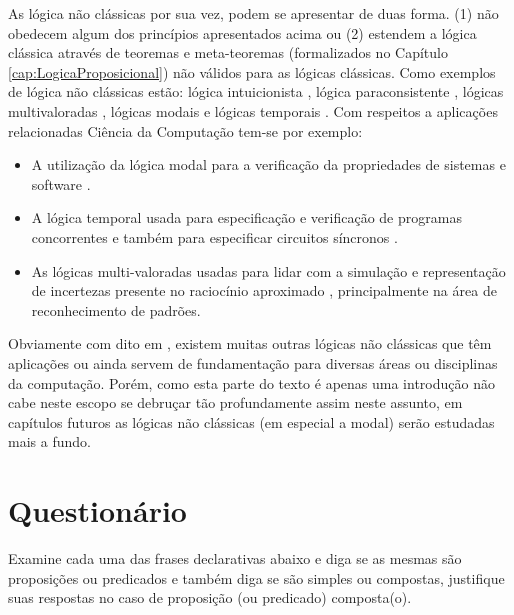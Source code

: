 As lógica não clássicas por sua vez, podem se apresentar de duas forma. (1) não obedecem algum dos princípios apresentados acima ou (2) estendem a lógica clássica através de teoremas e meta-teoremas (formalizados no Capítulo \ref{cap:LogicaProposicional}) não válidos para as lógicas clássicas. Como exemplos de lógica não clássicas estão: lógica intuicionista \cite{lungarzo1972}, lógica paraconsistente \cite{da2008logica}, lógicas multivaloradas \cite{BenjaV1, magnus2020}, lógicas modais \cite{magnus2020} e lógicas temporais \cite{halpern1983, harel1979, manna1979}. Com respeitos a aplicações relacionadas Ciência da Computação tem-se por exemplo:

\begin{itemize}
	\item A utilização da lógica modal para a verificação da propriedades de sistemas e software \cite{harel1979}.
	\item A lógica temporal usada para especificação e verificação de programas
concorrentes \cite{manna1979} e também para especificar circuitos síncronos \cite{halpern1983}.
	\item As lógicas multi-valoradas usadas para lidar com a simulação e representação de
incertezas presente no raciocínio aproximado \cite{BenjaV1}, principalmente na área de reconhecimento de padrões.
\end{itemize}

Obviamente com dito em \cite{BenjaV1}, existem muitas outras lógicas não clássicas que têm aplicações ou ainda servem de fundamentação para diversas áreas ou disciplinas da computação. Porém, como esta parte do texto é apenas uma introdução não cabe neste escopo se debruçar tão profundamente assim neste assunto, em capítulos futuros as lógicas não clássicas (em especial a modal) serão estudadas mais a fundo. 
 
 \section{Questionário}
 
 \begin{exercise}
 	Examine cada uma das frases declarativas abaixo e diga se as mesmas são proposições ou predicados e também diga se são simples ou compostas, justifique suas respostas no caso de proposição (ou predicado) composta(o). 
 \end{exercise}

